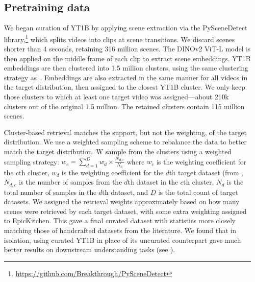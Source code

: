 \documentclass[]{fairmeta}
\begin{document}
\subsection{Pretraining data}
\label{app:pretraining_data_appendix}

We began curation of YT1B by applying scene extraction via the PySceneDetect library,\footnote{\url{https://github.com/Breakthrough/PySceneDetect}} which splits videos into clips at scene transitions.
We discard scenes shorter than 4 seconds, retaining 316 million scenes.
The DINOv2 ViT-L model is then applied on the middle frame of each clip to extract scene embeddings.
YT1B embeddings are then clustered into 1.5 million clusters, using the same clustering strategy as~\citet{oquab2023dinov2}.
Embeddings are also extracted in the same manner for all videos in the target distribution, then assigned to the closest YT1B cluster.
We only keep those clusters to which at least one target video was assigned---about 210k clusters out of the original 1.5 million. The retained clusters contain 115 million scenes.

Cluster-based retrieval matches the support, but not the weighting, of the target distribution.
We use a weighted sampling scheme to rebalance the data to better match the target distribution.
W sample from the clusters using a weighted sampling strategy: $w_c = \sum_{d=1}^{D} w_d \times \frac{N_{d,c}}{N_d}$
where $w_c$ is the weighting coefficient for the $c$th cluster, $w_d$ is the weighting coefficient for the $d$th target dataset (from , $N_{d,c}$ is the number of samples from the $d$th dataset in the $c$th cluster, $N_d$ is the total number of samples in the $d$th dataset, and $D$ is the total count of target datasets.
We assigned the retrieval weights approximately based on how many scenes were retrieved by each target dataset, with some extra weighting assigned to EpicKitchen.
This gave a final curated dataset with statistics more closely matching those of handcrafted datasets from the literature.
We found that in isolation, using curated YT1B in place of its uncurated counterpart gave much better results on downstream  understanding tasks (see ).
\end{document}
